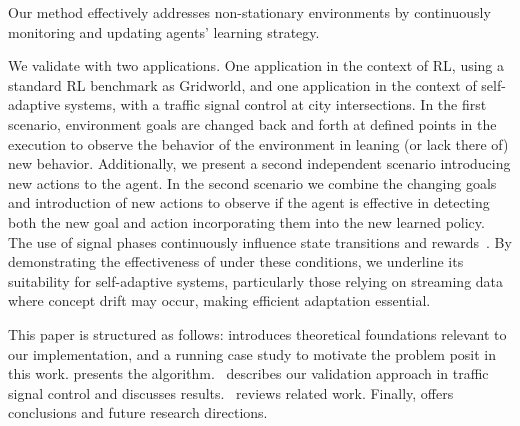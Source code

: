 Our method effectively addresses non-stationary environments by continuously monitoring and 
updating agents' learning strategy. 

We validate \adaptiverl with two applications. One application in the context of \ac{RL}, using a 
standard \ac{RL} benchmark as Gridworld, and one application in the context of self-adaptive systems, 
with a traffic signal control at city intersections. In the first scenario, environment goals are changed 
back and forth at defined points in the execution to observe the behavior of the environment in leaning 
(or lack there of) new behavior. Additionally, we present a second independent scenario introducing 
new actions to the agent. In the second scenario we combine the changing goals and introduction of 
new actions to observe if the agent is effective in detecting both the new goal and action incorporating 
them into the new learned policy. The use of signal phases continuously influence state transitions and 
rewards~\cite{meta-rl-traffic}. By demonstrating the effectiveness of \adaptiverl under these conditions, 
we underline its suitability for self-adaptive systems, particularly those relying on streaming data where 
concept drift may occur, making efficient adaptation essential.

This paper is structured as follows:  introduces theoretical foundations relevant to 
our implementation, and a running case study to motivate the problem posit in this work.  presents the \adaptiverl algorithm.~ describes our validation approach in traffic signal control and discusses results.~ reviews related work. Finally,  offers conclusions and future research directions.





\endinput

